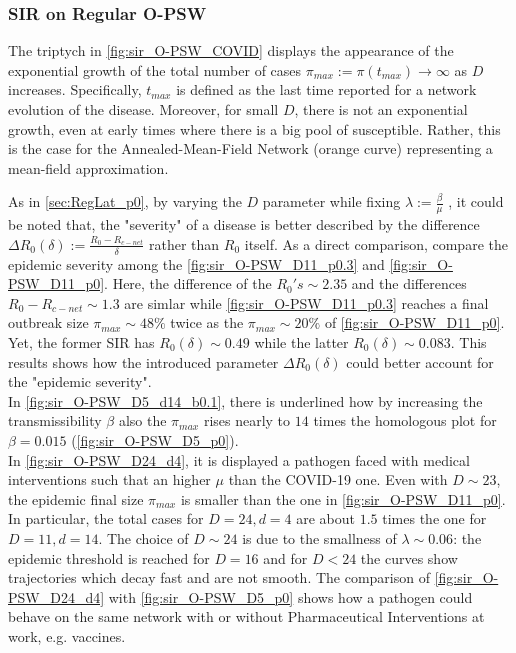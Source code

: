 \documentclass[a4paper,10pt,twoside]{book} %
\theoremstyle{definition}
\begin{document}
\subsubsection*{SIR on Regular O-PSW}
The triptych in \autoref{fig:sir_O-PSW_COVID} displays the appearance of the exponential growth of the total number of cases $\pi_{max}:= \pi( t_{max}) \to \infty$ as $D$ increases. Specifically, $ t_{max}$ is defined as the last time reported for a network evolution of the disease. Moreover, for small $D$, there is not an exponential growth, even at early times where there is a big pool of susceptible. Rather, this is the case for the Annealed-Mean-Field Network (orange curve) representing a mean-field approximation.

As in \autoref{sec:RegLat_p0}, by varying the $D$ parameter while fixing $\lambda:=\frac{\beta}{ \mu}$ , it could be noted that, the "severity" of a disease is better described by the difference $\Delta R_0 (\delta) := \frac{R_0 - R_{c-net}}{\delta}$ rather than $R_0 $ itself. As a direct comparison, compare the epidemic severity among the \autoref{fig:sir_O-PSW_D11_p0.3} and \autoref{fig:sir_O-PSW_D11_p0}. Here, the difference of the $R_0's \sim 2.35$ and the differences  $R_0 - R_{c-net} \sim 1.3$ are simlar while \autoref{fig:sir_O-PSW_D11_p0.3} reaches a final outbreak size $\pi_{max} \sim 48\%$ twice as the $\pi_{max} \sim 20\%$ of \autoref{fig:sir_O-PSW_D11_p0}. Yet, the former SIR has $ R_0(\delta) \sim 0.49$ while the latter $ R_0(\delta) \sim 0.083$. This results shows how the introduced parameter $\Delta R_0 (\delta)$ could better account for the "epidemic severity".\\
In \autoref{fig:sir_O-PSW_D5_d14_b0.1}, there is underlined how by increasing the transmissibility $ \beta$  also the $ \pi_{max}$ rises nearly to $ 14$ times the homologous plot for $ \beta = 0.015$ (\autoref{fig:sir_O-PSW_D5_p0}).\\
In \autoref{fig:sir_O-PSW_D24_d4}, it is displayed a pathogen faced with medical interventions such that an higher $ \mu$ than the COVID-19 one. Even with $D \sim 23$, the epidemic final size $\pi_{max}$  is smaller than the one in \autoref{fig:sir_O-PSW_D11_p0}. In particular, the total cases for $ D = 24, d = 4$ are about $1.5$ times the one for $D = 11, d = 14$.
The choice of $D \sim 24$ is due to the smallness of $\lambda \sim 0.06$: the epidemic threshold is reached for $D = 16$ and for $D < 24$ the curves show trajectories which decay fast and are not smooth. The comparison of \autoref{fig:sir_O-PSW_D24_d4} with \autoref{fig:sir_O-PSW_D5_p0} shows how a pathogen could behave on the same network with or without Pharmaceutical Interventions at work, e.g. vaccines.
\end{document}
